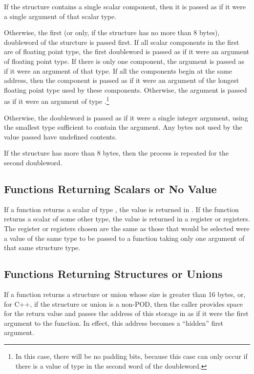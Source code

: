 If the structure contains a single scalar component, then it is passed
as if it were a single argument of that scalar type.

Otherwise, the first (or only, if the structure has no more than 8
bytes), doubleword of the sturcture is passed first.  If all scalar
components in the first are of floating point type, the first
doubleword is passed as if it were an argument of floating point type.
If there is only one component, the argument is passed as if it were
an argument of that type.  If all the components begin at the same
address, then the component is passed as if it were an argument of the
longest floating point type used by these components.  Otherwise, the
argument is passed as if it were an argument of type
.\footnote{In this case, there will be no padding
  bits, because this case can only occur if there is a value of type
   in the second word of the doubleword.}

Otherwise, the doubleword is passed as if it were a single integer
argument, using the smallest type sufficient to contain the argument.
Any bytes not used by the value passed have undefined contents.  

If the structure has more than 8 bytes, then the process is repeated
for the second doubleword.

\subsection{Functions Returning Scalars or No Value}

If a function returns a scalar of type , the value is
returned in .  If the function returns a scalar of some other
type, the value is returned in a register or registers.  The register
or registers chosen are the same as those that would be selected were
a value of the same type to be passed to a function taking only one
argument of that same structure type.

\subsection{Functions Returning Structures or Unions}

If a function returns a structure or union whose size is greater than
16 bytes, or, for C++, if the structure or union is a non-POD, then
the caller provides space for the return value and passes the address
of this storage in \RBX as if it were the first argument to the
function.  In effect, this address becomes a ``hidden'' first
argument.

